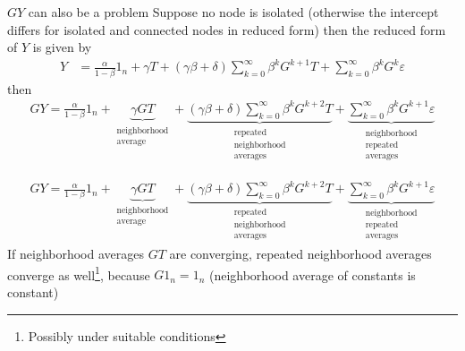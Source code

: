 \documentclass[aspectratio=169]{beamer}
\theoremstyle{remark}
\begin{document}
\begin{frame}{$GY$ can also be a problem}
    Suppose no node is isolated (otherwise the intercept differs for isolated and connected nodes in reduced form) then the reduced form of $Y$ is given by
    \begin{align*}
        Y & = \frac{\alpha}{1 - \beta} 1_n  + \gamma T + (\gamma \beta + \delta) \sum_{k=0}^\infty \beta^k G^{k+1} T + \sum_{k=0}^\infty \beta^k G^k \varepsilon
    \end{align*}
    then
    \begin{align*}
        GY = 
        \frac{\alpha}{1 - \beta} 1_n + 
        \underbrace{\gamma G T}_{\substack{\text{neighborhood}                                              \\ \text{average}}} + 
        \underbrace{(\gamma \beta + \delta) \sum_{k=0}^\infty \beta^k G^{k+2} T}_{\substack{\text{repeated} \\ \text{neighborhood} \\ \text{averages}}} +
        \underbrace{\sum_{k=0}^\infty \beta^k G^{k+1} \varepsilon}_{\substack{\text{neighborhood}           \\ \text{repeated} \\ \text{averages}}}
    \end{align*}
\end{frame}

\begin{frame}
    \begin{align*}
        GY = 
        \frac{\alpha}{1 - \beta} 1_n + 
        \underbrace{\gamma G T}_{\substack{\text{neighborhood}                                              \\ \text{average}}} + 
        \underbrace{(\gamma \beta + \delta) \sum_{k=0}^\infty \beta^k G^{k+2} T}_{\substack{\text{repeated} \\ \text{neighborhood} \\ \text{averages}}} +
        \underbrace{\sum_{k=0}^\infty \beta^k G^{k+1} \varepsilon}_{\substack{\text{neighborhood}           \\ \text{repeated} \\ \text{averages}}}
    \end{align*}
    If neighborhood averages $GT$ are converging, repeated neighborhood averages converge as well\footnote{Possibly under suitable conditions}, because $G 1_n = 1_n$ (neighborhood average of constants is constant)
\end{frame}
\end{document}
